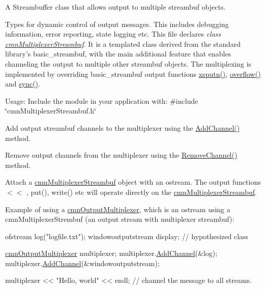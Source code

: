 A Streambuffer class that allows output to multiple streambuf objects. 

Types for dynamic control of output messages. This includes debugging information, error reporting, state logging etc. This file declares {\itshape class \hyperlink{classcmn_multiplexer_streambuf}{cmn\-Multiplexer\-Streambuf}}. It is a templated class derived from the standard library's basic\-\_\-streambuf, with the main additional feature that enables channeling the output to multiple other streambuf objects. The multiplexing is implemented by overriding basic\-\_\-streambuf output functions \hyperlink{classcmn_multiplexer_streambuf_a0e5181e114c169527135d01b28d94169}{xsputn()}, \hyperlink{classcmn_multiplexer_streambuf_a90999d31356176b52174452e2a43c1ae}{overflow()} and \hyperlink{classcmn_multiplexer_streambuf_a3e1f49548cb968afcdeabe62da5a5ae9}{sync()}.

Usage\-: Include the module in your application with\-: \#include \char`\"{}cmn\-Multiplexer\-Streambuf.\-h\char`\"{}

Add output streambuf channels to the multiplexer using the \hyperlink{classcmn_multiplexer_streambuf_a1e33a4858eb94ed085987ddbcc01a1d0}{Add\-Channel()} method.

Remove output channels from the multiplexer using the \hyperlink{classcmn_multiplexer_streambuf_affd9794b9412295cf157d204fc71cf8e}{Remove\-Channel()} method.

Attach a \hyperlink{classcmn_multiplexer_streambuf}{cmn\-Multiplexer\-Streambuf} object with an ostream. The output functions $<$$<$ , put(), write() etc will operate directly on the \hyperlink{classcmn_multiplexer_streambuf}{cmn\-Multiplexer\-Streambuf}.

Example of using a \hyperlink{classcmn_output_multiplexer}{cmn\-Output\-Multiplexer}, which is an ostream using a cmn\-Multiplexer\-Strembuf (an output stream with multiplexer streambuf)\-:


\begin{DoxyCode}
ofstream log(\textcolor{stringliteral}{"logfile.txt"});
windowoutputstream display;   \textcolor{comment}{// hypothesized class}

\hyperlink{classcmn_output_multiplexer}{cmnOutputMultiplexer} multiplexer;
multiplexer.\hyperlink{classcmn_output_multiplexer_a70d534895f21217e1e7e75e837fc65e7}{AddChannel}(&log);
multiplexer.\hyperlink{classcmn_output_multiplexer_a70d534895f21217e1e7e75e837fc65e7}{AddChannel}(&windowoutputstream);

multiplexer << \textcolor{stringliteral}{"Hello, world"} << endl;  \textcolor{comment}{// channel the message to all streams.}
\end{DoxyCode}


